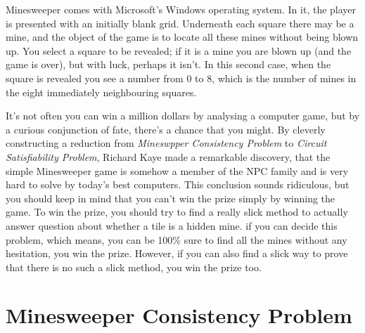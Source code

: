 \documentclass{article}
\begin{document}
Minesweeper comes with Microsoft's Windows operating system. In it, the player is presented with an initially blank grid. Underneath each square there may be a mine, and the object of the game is to locate all these mines without being blown up. You select a square to be revealed; if it is a mine you are blown up (and the game is over), but with luck, perhaps it isn't. In this second case, when the square is revealed you see a number from 0 to 8, which is the number of mines in the eight immediately neighbouring squares. 

It's not often you can win a million dollars by analysing a computer game, but by a curious conjunction of fate, there's a chance that you might. By cleverly constructing a reduction from \textit{Mineswpper Consistency Problem} to \textit{Circuit Satisfiability Problem}, Richard Kaye made a remarkable discovery, that the simple Minesweeper game is somehow a member of the NPC family and is very hard to solve by today's best computers. This conclusion sounds ridiculous, but you should keep in mind that you can't win the prize simply by winning the game. To win the prize, you should try to find a really slick method to actually answer question about whether a tile is a hidden mine. if you can decide this problem, which means, you can be 100\% sure to find all the mines without any hesitation, you win the prize. However, if you can also find a slick way to prove that there is no such a slick method, you win the prize too.


\section{Minesweeper Consistency Problem}

\begin{center}
  \begin{minesweeper}[rows=6,columns=6,scale=.8]
    \framepuzzle
  \end{minesweeper}
  \hspace{1.5cm}
  \begin{minesweeper}[rows=6,columns=6,scale=.8]
    \framepuzzle
  \end{minesweeper}
\end{center}
\end{document}
